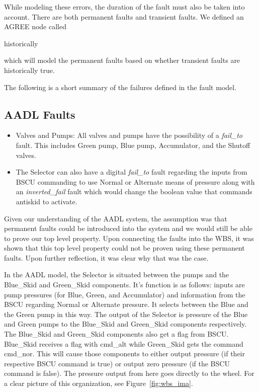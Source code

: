 While modeling these errors, the duration of the fault must also be taken into account. There are both permanent faults and transient faults. We defined an AGREE node called 
\begin{tt}
historically
\end{tt}
which will model the permanent faults based on whether transient faults are historically true. 

The following is a short summary of the failures defined in the fault model. 

\subsection{AADL Faults}
\begin{itemize}

\item Valves and Pumps: All valves and pumps have the possibility of a \textit{fail\_to} fault. This includes Green pump, Blue pump, Accumulator, and the Shutoff valves. 

\item  The Selector can also have a digital \textit{fail\_to} fault regarding the inputs from BSCU commanding to use Normal or Alternate means of pressure along with an \textit{inverted\_fail} fault which would change the boolean value that commands antiskid to activate. 

\end{itemize}

Given our understanding of the AADL system, the assumption was that permanent faults could be introduced into the system and we would still be able to prove our top level property. Upon connecting the faults into the WBS, it was shown that this top level property could not be proven using these permanent faults. Upon further reflection, it was clear why that was the case. 

In the AADL model, the Selector is situated between the pumps and the Blue\_Skid and Green\_Skid components. It's function is as follows: inputs are pump pressures (for Blue, Green, and Accumulator) and information from the BSCU regarding Normal or Alternate pressure. It selects between the Blue and the Green pump in this way. The output of the Selector is pressure of the Blue and Green pumps to the Blue\_Skid and Green\_Skid components respectively. The Blue\_Skid and Green\_Skid components also get a flag from BSCU. Blue\_Skid receives a flag with cmd\_alt while Green\_Skid gets the command cmd\_nor. This will cause those components to either output pressure (if their respective BSCU command is true) or output zero pressure (if the BSCU command is false). The pressure output from here goes directly to the wheel. For a clear picture of this organization, see Figure~\ref{fig:wbs_ima}.

